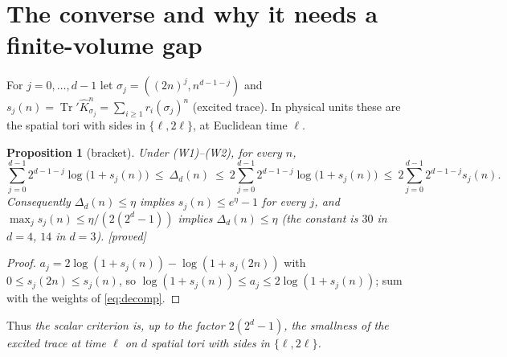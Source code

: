 \documentclass[11pt,a4paper]{article}
\theoremstyle{plain}
\newtheorem{proposition}[theorem]{Proposition}
\theoremstyle{definition}
\theoremstyle{remark}
\numberwithin{equation}{section}
\newcommand{\Tr}{\operatorname{Tr}}
\newcommand{\Kh}{\widehat K}
\newcommand{\st}[1]{\textsf{[#1]}}
\begin{document}
\section{The converse and why it needs a finite-volume gap}\label{sec:converse}

For $j=0,\dots,d-1$ let $\sigma_j=((2n)^j,n^{d-1-j})$ and $s_j(n)=\Tr'\Kh_{\sigma_j}^n=\sum_{i\ge1}r_i(\sigma_j)^n$ (excited trace). In
physical units these are the spatial tori with sides in $\{\ell,2\ell\}$, at Euclidean time $\ell$.

\begin{proposition}[bracket]\label{prop:bracket}
Under (W1)--(W2), for every $n$,
\[
\sum_{j=0}^{d-1}2^{d-1-j}\log\bigl(1+s_j(n)\bigr)\ \le\ \Delta_d(n)\ \le\ 2\sum_{j=0}^{d-1}2^{d-1-j}\log\bigl(1+s_j(n)\bigr)\ \le\ 2\sum_{j=0}^{d-1}2^{d-1-j}s_j(n).
\]
Consequently $\Delta_d(n)\le\eta$ implies $s_j(n)\le e^\eta-1$ for every $j$, and $\max_js_j(n)\le\eta/(2(2^d-1))$ implies
$\Delta_d(n)\le\eta$ (the constant is $30$ in $d=4$, $14$ in $d=3$). \st{proved}
\end{proposition}
\begin{proof}
$a_j=2\log(1+s_j(n))-\log(1+s_j(2n))$ with $0\le s_j(2n)\le s_j(n)$, so $\log(1+s_j(n))\le a_j\le2\log(1+s_j(n))$; sum with the weights of
\eqref{eq:decomp}.
\end{proof}
Thus \emph{the scalar criterion is, up to the factor $2(2^d-1)$, the smallness of the excited trace at time $\ell$ on $d$ spatial tori with
sides in $\{\ell,2\ell\}$.}
\end{document}
